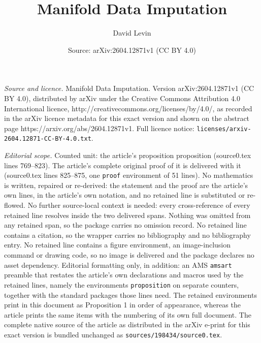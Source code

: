 \documentclass[10pt,a4paper]{amsart}
\title{Manifold Data Imputation}
\author{David Levin}
\date{Source: arXiv:2604.12871v1 (CC BY 4.0)}
\begin{document}
\maketitle

\noindent\emph{Source and licence.} Manifold Data Imputation. Version arXiv:2604.12871v1 (CC BY 4.0), distributed by arXiv under the Creative Commons Attribution 4.0 International licence, http://creativecommons.org/licenses/by/4.0/, as recorded in the arXiv licence metadata for this exact version and shown on the abstract page https://arxiv.org/abs/2604.12871v1. Full licence notice: \texttt{licenses/arxiv-2604.12871-CC-BY-4.0.txt}.\par\smallskip

\noindent\textit{Editorial scope.} Counted unit: the article's proposition proposition (source0.tex lines 769--823). The article's complete original proof of it is delivered with it (source0.tex lines 825--875, one \texttt{proof} environment of 51 lines). No mathematics is written, repaired or re-derived: the statement and the proof are the article's own lines, in the article's own notation, and no retained line is substituted or re-flowed.  No further source-local context is needed: every cross-reference of every retained line resolves inside the two delivered spans.  Nothing was omitted from any retained span, so the package carries no omission record.  No retained line contains a citation, so the wrapper carries no bibliography and no bibliography entry.  No retained line contains a figure environment, an image-inclusion command or drawing code, so no image is delivered and the package declares no asset dependency.  Editorial formatting only, in addition: an AMS \texttt{amsart} preamble that restates the article's own declarations and macros used by the retained lines, namely the environments \texttt{proposition} on separate counters, together with the standard packages those lines need.  The retained environments print in this document as Proposition 1 in order of appearance, whereas the article prints the same items with the numbering of its own full document.  The complete native source of the article as distributed in the arXiv e-print for this exact version is bundled unchanged as \texttt{sources/198434/source0.tex}.
\end{document}
